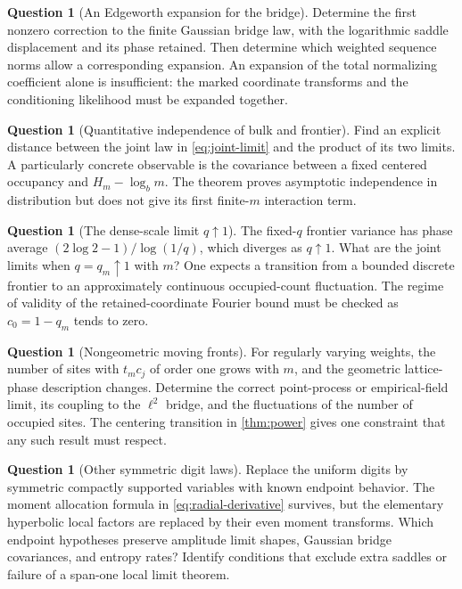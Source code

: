 \documentclass[11pt,a4paper]{article}
\numberwithin{equation}{section}
\theoremstyle{definition}
\newtheorem{question}[theorem]{Question}
\theoremstyle{remark}
\begin{document}
\begin{question}[An Edgeworth expansion for the bridge]
Determine the first nonzero correction to the finite Gaussian bridge
law, with the logarithmic saddle displacement and its phase retained.
Then determine which weighted sequence norms allow a corresponding
expansion. An expansion of the total normalizing coefficient alone is
insufficient: the marked coordinate transforms and the conditioning
likelihood must be expanded together.
\end{question}

\begin{question}[Quantitative independence of bulk and frontier]
Find an explicit distance between the joint law in
\cref{eq:joint-limit} and the product of its two limits. A particularly
concrete observable is the covariance between a fixed centered occupancy
and $H_m-\log_bm$. The theorem proves asymptotic independence in
distribution but does not give its first finite-$m$ interaction term.
\end{question}

\begin{question}[The dense-scale limit $q\uparrow1$]
The fixed-$q$ frontier variance has phase average
$(2\log2-1)/\log(1/q)$, which diverges as $q\uparrow1$.
What are the joint limits when $q=q_m\uparrow1$ with $m$?
One expects a transition from a bounded discrete frontier to an
approximately continuous occupied-count fluctuation. The regime of
validity of the retained-coordinate Fourier bound must be checked as
$c_0=1-q_m$ tends to zero.
\end{question}

\begin{question}[Nongeometric moving fronts]
For regularly varying weights, the number of sites with $t_mc_j$ of
order one grows with $m$, and the geometric lattice-phase description
changes. Determine the correct point-process or empirical-field limit,
its coupling to the $\ell^2$ bridge, and the fluctuations of the number
of occupied sites. The centering transition in \cref{thm:power} gives
one constraint that any such result must respect.
\end{question}

\begin{question}[Other symmetric digit laws]
Replace the uniform digits by symmetric compactly supported variables
with known endpoint behavior. The moment allocation formula in
\cref{eq:radial-derivative} survives, but the elementary hyperbolic
local factors are replaced by their even moment transforms. Which
endpoint hypotheses preserve amplitude limit shapes, Gaussian bridge
covariances, and entropy rates? Identify conditions that exclude extra
saddles or failure of a span-one local limit theorem.
\end{question}
\end{document}
